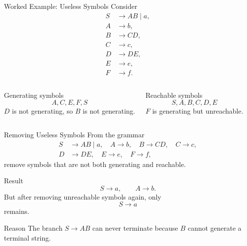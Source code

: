 \documentclass[aspectratio=169,10pt]{beamer}
\begin{document}
\begin{frame}{Worked Example: Useless Symbols}
\small
Consider
\[
\begin{aligned}
S&\to AB\mid a,\\
A&\to b,\\
B&\to CD,\\
C&\to c,\\
D&\to DE,\\
E&\to e,\\
F&\to f.
\end{aligned}
\]

\begin{columns}[T,onlytextwidth]
\begin{block}{Generating symbols}
\[
A,C,E,F,S
\]
\(D\) is not generating, so \(B\) is not generating.
\end{block}

\begin{alertblock}{Reachable symbols}
\[
S,A,B,C,D,E
\]
\(F\) is generating but unreachable.
\end{alertblock}
\end{columns}
\end{frame}

\begin{frame}{Removing Useless Symbols}
\small
From the grammar
\[
\begin{aligned}
S&\to AB\mid a,\quad A\to b,\quad B\to CD,\quad C\to c,\\
D&\to DE,\quad E\to e,\quad F\to f,
\end{aligned}
\]
remove symbols that are not both generating and reachable.

\vspace{0.5em}
\begin{block}{Result}
\[
S\to a,
\qquad
A\to b.
\]
But after removing unreachable symbols again, only
\[
S\to a
\]
remains.
\end{block}

\begin{alertblock}{Reason}
The branch \(S\to AB\) can never terminate because \(B\) cannot generate a terminal string.
\end{alertblock}
\end{frame}
\end{document}
